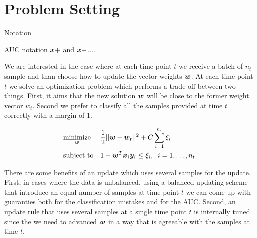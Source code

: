 \section{Problem Setting}

Notation

AUC notation $\bm{x}+$ and $\bm{x}-$....

We are interested in the case where at each time point $t$ we receive a batch of $n_t$ sample and than choose how to update the vector weights $\bm{w}$. At each time point $t$ we solve an optimization problem which performs a trade off between two things. First, it aims that the new solution $\bm{w}$ will be close to the former weight vector $w_t$. Second we prefer to classify all the samples provided at time $t$ correctly with a margin of 1.

\begin{equation*}
\begin{aligned}
& \underset{\bm{w}}{\text{minimize}}
& & \frac{1}{2} || \bm{w} - \bm{w}_t ||^2 + C \sum\limits_{i=1}^{n_t}{\xi_i} \\
& \text{subject to}
& & 1 - \bm{w}^T \bm{x}_i \bm{y}_i \leq \xi_i, \;
 \; i = 1, \ldots, n_t.
\end{aligned}
\end{equation*}

There are some benefits of an update which uses several samples for the update. First, in cases where the data is unbalanced, using a balanced updating scheme that introduce an equal number of samples at time point $t$ we can come up with guaranties both for the classification mistakes and for the AUC.
Second, an update rule that uses several samples at a single time point $t$ is internally tuned since the we need to advanced $\bm{w}$ in a way that is agreeable with the samples at time $t$.
